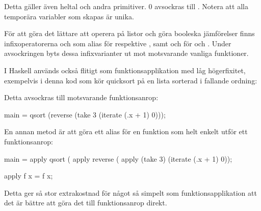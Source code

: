 \documentclass[../Core]{subfiles}
\begin{document}
Detta gäller även heltal och andra primitiver. $0$ avsockras till
. Notera att alla temporära variabler som skapas är unika.
            
    
För att göra det lättare att operera på listor och göra booleska
jämförelser finns infixoperatorerna \ic{\&\&} och \ic{||} som alias för  respektive ,
samt \ic{++} och \ic{:} för  och . Under avsockringen byts dessa
infixvarianter ut mot motsvarande vanliga funktioner. 


I Haskell används också \ic{\$} flitigt som funktionsapplikation med låg
högerfixitet, exempelvis i denna kod som kör quicksort på en
lista sorterad i fallande ordning:


Detta avsockras till motsvarande funktionsanrop:

\begin{codeEx}
main = qsort (reverse (take 3 (iterate (\x.x + 1) 0)));
\end{codeEx}

En annan metod är att göra \ic{\$} ett alias för en funktion  som
helt enkelt utför ett funktionsanrop:

\begin{codeEx}
main = apply qsort 
     ( apply reverse 
     ( apply (take 3) (iterate (\x.x + 1) 0));

apply f x = f x;
\end{codeEx}

Detta ger så stor extrakostnad för något så simpelt som funktionsapplikation
att det är bättre att göra det till funktionsanrop direkt.
        


\end{document}
